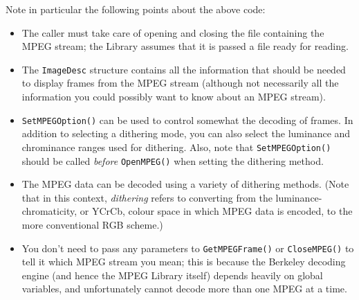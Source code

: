 \documentclass[11pt]{article}
\newcommand{\code}[1]{\texttt{#1}}
\begin{document}
Note in particular the following points about the above code:
\begin{itemize}
\item The caller must take care of opening and closing the file
containing the MPEG stream; the Library assumes that it is passed a
file ready for reading.
\item The \code{ImageDesc} structure contains all the information that
should be needed to display frames from the MPEG stream (although not
necessarily all the information you could possibly want to know about
an MPEG stream).  
\item \code{SetMPEGOption()} can be used to control somewhat the
decoding of frames.  In addition to selecting a dithering mode, you
can also select the luminance and chrominance ranges used for
dithering.  Also, note that \code{SetMPEGOption()} should be called
{\em before} \code{OpenMPEG()} when setting the dithering method.
\item The MPEG data can be decoded using a variety of dithering
methods.  (Note that in this context, {\em dithering\/} refers to converting
from the luminance-chromaticity, or YCrCb, colour space in which MPEG
data is encoded, to the more conventional RGB scheme.)
\item You don't need to pass any parameters to \code{GetMPEGFrame()}
  or \code{CloseMPEG()} to tell it which MPEG stream you mean; this is
  because the Berkeley decoding engine (and hence the MPEG Library
  itself) depends heavily on global variables, and unfortunately
  cannot decode more than one MPEG at a time.
\end{itemize}
\end{document}
